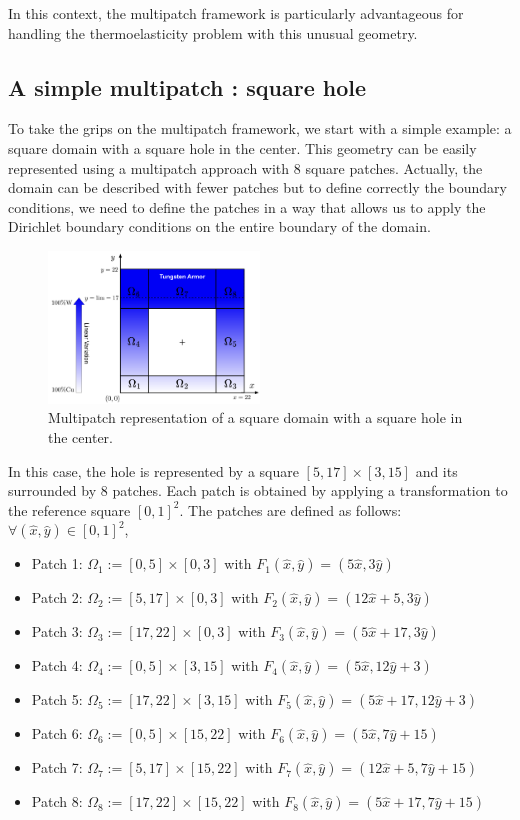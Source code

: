 \documentclass[a4paper,12pt,twoside]{report}
\begin{document}
In this context, the multipatch framework is particularly advantageous for handling the thermoelasticity problem with this unusual geometry. 

\subsection{A simple multipatch : square hole}

To take the grips on the multipatch framework, we start with a simple example: a square domain with a square hole in the center. This geometry can be easily represented using a multipatch approach with 8 square patches. Actually, the domain can be described with fewer patches but to define correctly the boundary conditions, we need to define the patches in a way that allows us to apply the Dirichlet boundary conditions on the entire boundary of the domain.

\begin{figure}[!h]
	\centering
	\includegraphics[width=0.5\textwidth]{figures/square_hole.png}
	\caption{Multipatch representation of a square domain with a square hole in the center.}
\end{figure}

In this case, the hole is represented by a square $[5,17] \times [3,15]$ and its surrounded by 8 patches. Each patch is obtained by applying a transformation to the reference square $[0,1]^2$. The patches are defined as follows: $\forall (\hat x, \hat y) \in [0,1]^2$,
\begin{itemize}
	\item Patch 1: $\Omega_1 := [0,5] \times [0,3]$ with $F_1(\hat x, \hat y) = (5\hat x, 3\hat y)$
	\item Patch 2: $\Omega_2 := [5,17] \times [0,3]$ with $F_2(\hat x, \hat y) = (12\hat x + 5, 3\hat y)$
	\item Patch 3: $\Omega_3 := [17,22] \times [0,3]$ with $F_3(\hat x, \hat y) = (5\hat x + 17, 3\hat y)$
	\item Patch 4: $\Omega_4 := [0,5] \times [3,15]$ with $F_4(\hat x, \hat y) = (5\hat x, 12\hat y + 3)$
	\item Patch 5: $\Omega_5 := [17,22] \times [3,15]$ with $F_5(\hat x, \hat y) = (5\hat x + 17, 12\hat y + 3)$
	\item Patch 6: $\Omega_6 := [0,5] \times [15,22]$ with $F_6(\hat x, \hat y) = (5\hat x, 7\hat y + 15)$
	\item Patch 7: $\Omega_7 := [5,17] \times [15,22]$ with $F_7(\hat x, \hat y) = (12\hat x + 5, 7\hat y + 15)$
	\item Patch 8: $\Omega_8 := [17,22] \times [15,22]$ with $F_8(\hat x, \hat y) = (5\hat x + 17, 7\hat y + 15)$
\end{itemize}
\end{document}
